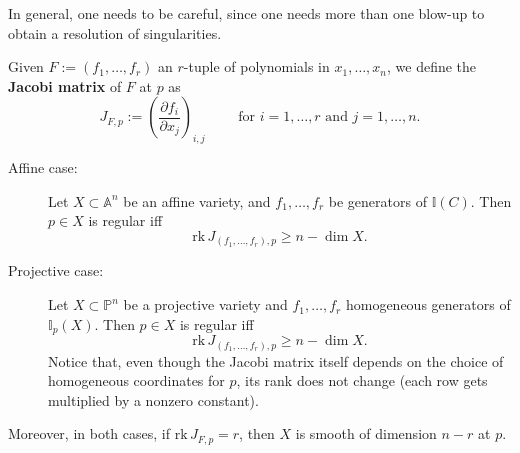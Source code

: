 In general, one needs to be careful, since one needs more than
one blow-up to obtain a resolution of singularities.
\begin{defn}
	Given $F := \left( f_1, \ldots, f_r \right)$ an $r$-tuple of polynomials in $x_1, \ldots, x_n$,
	we define the \textbf{Jacobi matrix} of $F$ at $p$ as
	\begin{equation}
		J_{F,p} := \left( \frac{\partial f_i}{\partial x_j}  \right)_{i,j}
		\qquad \text{ for } i =1, \ldots, r \text{ and } j = 1, \ldots, n
	.\end{equation} 
\end{defn}

\begin{prop}\leavevmode\vspace{-.2\baselineskip}
	\begin{description}
		\item[Affine case:] Let $X \subset \mathbb{A}^{n}$ be an affine variety, and
			$f_1, \ldots, f_r$ be generators of $\mathbb{I}\left( C \right)$.
			Then $p \in X$ is regular iff
			\begin{equation}
			\mathrm{rk}\, J_{\left( f_1, \ldots, f_r \right), p} \geq n - \dim X
			.\end{equation} 
		\item[Projective case:] Let $X \subset \mathbb{P}^{n}$ be a projective variety
			and $f_1, \ldots, f_r$ homogeneous generators of $\mathbb{I}_p\left( X \right)$.
			Then $p \in X$ is regular iff
			\begin{equation}
			\mathrm{rk}\, J_{\left( f_1, \ldots, f_r \right), p} \geq n - \dim X
			.\end{equation} 
			Notice that, even though the Jacobi matrix itself depends on the choice of
			homogeneous coordinates for $p$, its rank does not change (each row gets multiplied by
			a nonzero constant).
	\end{description}
	Moreover, in both cases, if $\mathrm{rk}\, J_{F,p} = r$,
	then $X$ is smooth of dimension $n - r$ at $p$.
\end{prop} 

